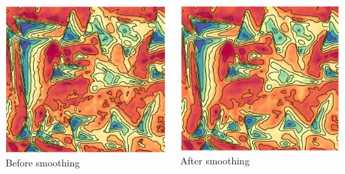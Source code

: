 \documentclass[aspectratio=169,t]{beamer}
\begin{document}
{\begin{columns}[T]
\begin{column}{.475\textwidth}
\begin{columns}[T]
\begin{column}{.1\textwidth}
				\end{column}
				\begin{column}{.45\textwidth}
					\centering
					\includegraphics[width=\textwidth]{figures/beforeFilter.png}
					Before smoothing
				\end{column}
				\begin{column}{.45\textwidth}
					\centering
					\includegraphics[width=\textwidth]{figures/afterFilter.png}
					After smoothing
				\end{column}
			\end{columns}
		\end{column}
	\end{columns}
}
\end{document}
